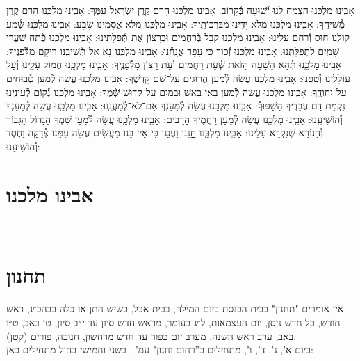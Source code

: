 \documentclass[twoside, openany, parskip=half, 11pt]{book}
\begin{document}
{אָבִֽינוּ מַלְכֵּֽנוּ הַצְמַח לָֽנוּ יְ֯שׁוּעָה בְּ֯קָרוֹב:\hfill \break
אָבִֽינוּ מַלְכֵּֽנוּ הָרֵם קֶֽרֶן יִשְׂרָאֵל עַמֶּךָ:\hfill \break
אָבִֽינוּ מַלְכֵּֽנוּ הָרֵם קֶרֶן מְ֯שִׁיחֶֽךָ:\hfill \break
אָבִֽינוּ מַלְכֵּֽנוּ מַלֵּא יָדֵֽינוּ מִבִּרְכוֹתֶֽיךָ:\hfill \break
אָבִֽינוּ מַלְכֵּֽנוּ מַלֵּא אֲסָמֵֽינוּ שָׂבָע:\hfill \break
אָבִֽינוּ מַלְכֵּֽנוּ שְׁ֯מַע קּוֹלֵֽנוּ חוּס וְ֯רַחֵם עָלֵֽינוּ:\hfill \break
אָבִֽינוּ מַלְכֵּֽנוּ קַבֵּל בְּ֯רַחֲמִים וּבְרָצוֹן אֶת־תְּ֯פִלָּתֵֽינוּ:\hfill \break
אָבִֽינוּ מַלְכֵּֽנוּ פְּ֯תַח שַׁעֲרֵי שָׁמַֽיִם לִתְפִלָּתֵֽנוּ:\hfill \break
אָבִֽינוּ מַלְכֵּֽנוּ זְ֯כוֹר כִּי עָפָר אֲנָֽחְ֯נוּ:\hfill \break
אָבִֽינוּ מַלְכֵּֽנוּ נָא אַל תְּ֯שִׁיבֵֽנּוּ רֵיקָם מִלְּ֯פָנֶיךָ:\hfill \break
אָבִֽינוּ מַלְכֵּֽנוּ תְּ֯הֵא הַשָּׁעָה הַזֹּאת שְׁ֯עַת רַחֲמִים וְ֯עֵת רָצוֹן מִלְּ֯פָנֶֽיךָ:\hfill \break
אָבִֽינוּ מַלְכֵּֽנוּ חֲמוֹל עָלֵֽינוּ וְ֯עַל עוֹלָלֵֽינוּ וְ֯טַפֵּֽנוּ:\hfill \break
אָבִֽינוּ מַלְכֵּֽנוּ עֲשֵׂה לְ֯מַעַן הֲרוּגִים עַל־שֵׁם קׇדְשֶׁךָ:\hfill \break
אָבִֽינוּ מַלְכֵּֽנוּ עֲשֵׂה לְ֯מַעַן טְ֯בוּחִים עַל־יִחוּדֶֽךָ:\hfill \break
אָבִֽינוּ מַלְכֵּֽנוּ עֲשֵׂה לְ֯מַעַן בָּאֵי בָאֵשׁ וּבַמַּיִם עַל־קִּדוּשׁ שְׁ֯מֶךָ:\hfill \break
אָבִֽינוּ מַלְכֵּֽנוּ נְ֯קוֹם לְ֯עֵינֵֽינוּ נִקְמַת דַּם עֲבָדֶיךָ הַשָׁפוּךְ֯:\hfill \break
אָבִֽינוּ מַלְכֵּֽנוּ עֲשֵׂה לְ֯מַעַנְךָ אִם־לֹא־לְ֯מַעֲנֵֽנוּ:\hfill \break
אָבִֽינוּ מַלְכֵּֽנוּ עֲשֵׂה לְ֯מַעַנְךָ וְ֯הוֹשִׁיעֵֽנוּ:\hfill \break
אָבִֽינוּ מַלְכֵּֽנוּ עֲשֵׂה לְ֯מַעַן רַחֲמֶיךָ הָרַבִּים:\hfill \break
אָבִֽינוּ מַלְכֵּֽנוּ עֲשֵׂה לְ֯מַעַן שִׁמְךָ הַגָּדוֹל הַגִּבּוֹר וְ֯הַנוֹרָא שֶׁנִקְרָא עָלֵינוּ:\hfill \break
אָבִֽינוּ מַלְכֵּֽנוּ חׇׇׇׇנֵּנוּ וַעֲנֵנוּ כִּי אֵין בָּנוּ מַעֲשִׂים עֲשֵׂה עִמָּנוּ צְ֯דָקָה וָחֶסֶד וְ֯הוֹשִׁיעֵנוּ:

}

\section[אבינו מלכנו]{ אבינו מלכנו }
\label{avinu malkeinu}


\avinumalkeinu

\vfill
{}\\
\section[תחנון]{ תחנון }
\label{tachanun mon thurs}
\begin{scriptsize}

\textsf{
אין אומרים "תחנון" בבית הכנסת ביום המילה, בבית אבל, כשיש חתן או כלה בבהכ״נ, ראש חודש, כל חדש ניסן, יום העצמאות, ל״ג בעומר, מראש חדש סיון עד י״ב סיון, ט` באב, ט״ו באב, ערב ראש השנה, מערב יום כפור עד חדש מרחשון, חנוכה, פורים (קטן).\\
ביום א', ג', ד', ו', מתחילים ב''רחום וחנון" עמ'
\pageref{nefilas_apayim}.
בשני וחמישי בחול מתחילים כאן:
}

\end{scriptsize}
\end{document}
